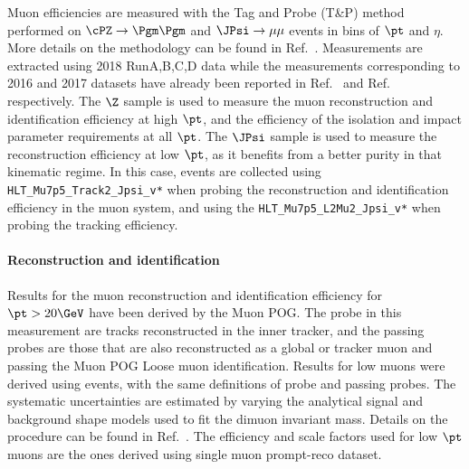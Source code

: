 
Muon efficiencies are measured with the Tag and Probe (T\&P) method performed on
$\cPZ \to \Pgm\Pgm$ and $\JPsi\to\mu\mu$ events in bins of $\pt$ and $\eta$. More
details on the methodology can be found in Ref.~\cite{CMS_AN_2015-277}. Measurements are extracted using 2018 RunA,B,C,D data while the measurements corresponding to 2016 and 2017 datasets have already been reported in Ref.~\cite{CMS_AN_2016-442} and Ref.~\cite{CMS_AN_2017-342} respectively.
%
The $\Z$ sample is used to measure the muon reconstruction and identification efficiency at high $\pt$,
and the efficiency of the isolation and impact parameter requirements at all $\pt$.
%
The $\JPsi$ sample is used to measure the reconstruction efficiency at low $\pt$,
as it benefits from a better purity in that kinematic regime. In this case,
events are collected using \verb=HLT_Mu7p5_Track2_Jpsi_v*= when probing the
reconstruction and identification efficiency in the muon system, and using the
 \verb=HLT_Mu7p5_L2Mu2_Jpsi_v*= when probing the tracking efficiency.

\paragraph*{Reconstruction and identification}

Results for the muon reconstruction and identification efficiency for $\pt > 20\GeV$
have been derived by the Muon POG.
The probe in this measurement are tracks reconstructed in the inner tracker, and
the passing probes are those that are also reconstructed as a global or tracker muon 
and passing the Muon POG Loose muon identification.
%
Results for low \pt muons were derived using \JPsi events, with the same definitions
of probe and passing probes. The systematic uncertainties are estimated by varying the analytical signal and background shape models used to fit 
the dimuon invariant mass. Details on the procedure can be found in Ref.~\cite{AN-15-277}. The efficiency and scale 
factors used for low $\pt$ muons are the ones derived using single muon prompt-reco dataset.

